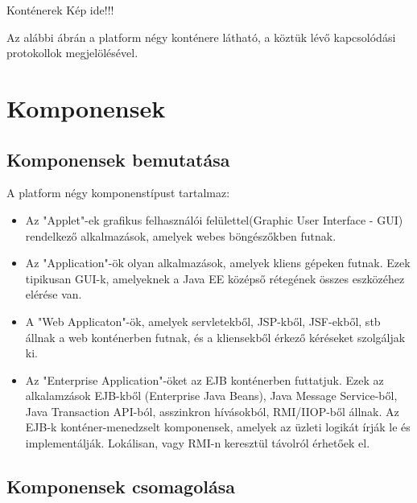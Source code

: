 \documentclass[centeredchapter]{thesis-ekf}
\theoremstyle{definition}
\theoremstyle{remark}
\begin{document}
Konténerek Kép ide!!!

Az alábbi ábrán a platform négy konténere látható, a köztük lévő kapcsolódási protokollok megjelölésével.

\section{Komponensek}

\subsection{Komponensek bemutatása}
A platform négy komponenstípust tartalmaz:
\begin{itemize}
	\item Az "Applet"-ek grafikus felhasználói felülettel(Graphic User Interface - GUI) rendelkező alkalmazások, amelyek webes böngészőkben futnak.
	
	\item Az "Application"-ök olyan alkalmazások, amelyek kliens gépeken futnak. Ezek tipikusan GUI-k, amelyeknek a Java EE középső rétegének összes eszközéhez elérése van.
	
	\item A "Web Applicaton"-ök, amelyek servletekből, JSP-kből, JSF-ekből, stb állnak a web konténerben futnak, és a kliensekből érkező kéréseket szolgáljak ki.
	
	\item Az "Enterprise Application"-öket az EJB konténerben futtatjuk. Ezek az alkalamzások EJB-kből (Enterprise Java Beans), Java Message Service-ből, Java Transaction API-ból, asszinkron hívásokból, RMI/IIOP-ből állnak. Az EJB-k konténer-menedzselt komponensek, amelyek az üzleti logikát írják le és implementálják. Lokálisan, vagy RMI-n keresztül távolról érhetőek el. 
	
\end{itemize} 

\subsection{Komponensek csomagolása}
\end{document}
